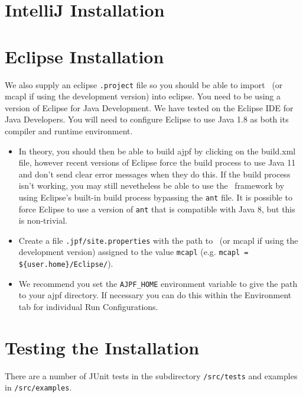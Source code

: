 \section{IntelliJ Installation}


\section{Eclipse Installation}

We also supply an eclipse \texttt{.project} file so you should be able to import \ajpfversion\ (or mcapl if using the development version)  into eclipse.  You need to be using a version of Eclipse for Java Development.  We have tested on the Eclipse IDE for Java Developers.  You will need to configure Eclipse to use Java 1.8 as both its compiler and runtime environment. 
\begin{itemize}
\item In theory, you should then be able to build ajpf by clicking on the build.xml file, however recent versions of Eclipse force the build process to use Java 11 and don't send clear error messages when they do this.  If the build process isn't working, you may still nevetheless be able to use the \mcapl\ framework by using Eclipse's built-in build process bypassing the \texttt{ant} file.  It is possible to force Eclipse to use a version of \texttt{ant} that is compatible with Java 8, but this is non-trivial.
\item Create a file \texttt{.jpf/site.properties} with the path to \ajpfversion\ (or mcapl if using the development version)  assigned to the value \texttt{mcapl} (e.g. \texttt{mcapl = \$\{user.home\}/Eclipse/\ajpfversion}).
\item We recommend you set the \texttt{AJPF\_HOME} environment variable to give the path to your ajpf directory.  If necessary you can do this within the Environment tab for individual Run Configurations.
\end{itemize}

\section{Testing the Installation}

There are a number of JUnit tests in the subdirectory \texttt{/src/tests} and examples in \texttt{/src/examples}.

